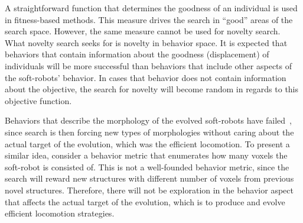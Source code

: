 A straightforward function that determines the goodness of an individual is used in fitness-based methods. This measure drives the search in ``good'' areas of the search space. However, the same measure cannot be used for novelty search. What novelty search seeks for is novelty in behavior space. It is expected that behaviors that contain information about the goodness (displacement) of individuals will be more successful than behaviors that include other aspects of the soft-robots' behavior. In cases that behavior does not contain information about the objective, the search for novelty will become random in regards to this objective function.

Behaviors that describe the morphology of the evolved soft-robots have failed~\citep{lehman2011evolving}, since search is then forcing new types of morphologies without caring about the actual target of the evolution, which was the efficient locomotion. To present a similar idea, consider a behavior metric that enumerates how many voxels the soft-robot is consisted of. This is not a well-founded behavior metric, since the search will reward new structures with different number of voxels from previous novel structures. Therefore, there will not be exploration in the behavior aspect that affects the actual target of the evolution, which is to produce and evolve efficient locomotion strategies. 

